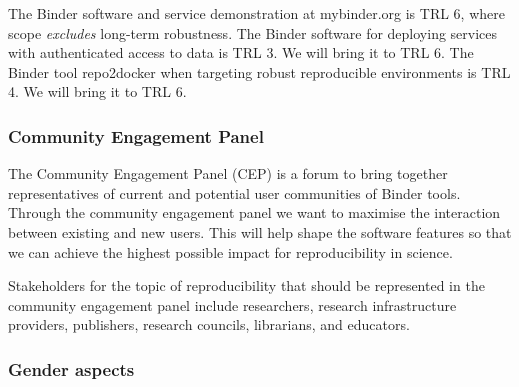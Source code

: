 The Binder software and service demonstration at mybinder.org is TRL 6,
where scope \emph{excludes} long-term robustness.
The Binder software for deploying services with authenticated access to data is TRL 3.
We will bring it to TRL 6.
The Binder tool repo2docker when targeting robust reproducible environments is TRL 4.
We will bring it to TRL 6.



\subsubsection{Community Engagement Panel}\label{sec:community-engagement-panel}
The Community Engagement Panel (CEP) is a forum to bring together
  representatives of current and potential user communities of Binder tools.
  Through the community engagement panel we want to maximise the interaction between existing and new users.
  This will help shape the software features so that we can
  achieve the highest possible impact for reproducibility in science.

  Stakeholders for the topic of reproducibility that should be represented in the
  community engagement panel include researchers, research infrastructure
  providers, publishers, research councils, librarians, and educators.

  

\subsubsection{Gender aspects}\label{sec:gender}





